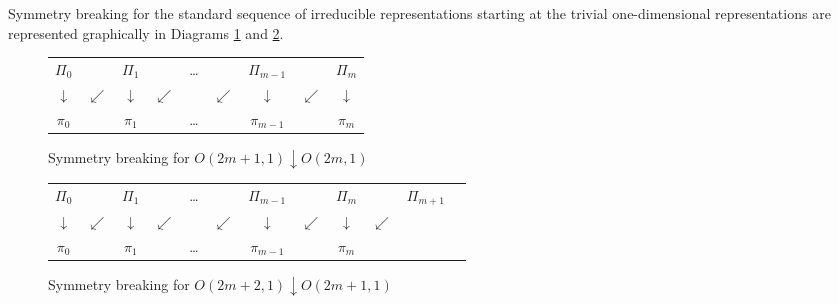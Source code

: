 \begin{theorem} 
\label{thm:SBOfg}
Symmetry breaking for the standard sequence
 of irreducible representations
 starting at the trivial one-dimensional representations
 are represented graphically
 in Diagrams \ref{fig:Hasse1} and \ref{fig:Hasse2}. 

\medskip
\begin{figure}[htp]
\caption{Symmetry breaking for $O(2m+1,1)\downarrow O(2m,1)$}
\begin{center}
\begin{tabular}{c@{~}c@{~}c@{~}c@{~}c@{~}c@{~}c@{~}c@{~}c}
$\Pi_0$ & & $\Pi_1$ & &\dots & & $\Pi_{m-1}$ & & $\Pi_{m}$ 
\\
$\downarrow$ & $\swarrow$ & $\downarrow$ & $\swarrow$ & & $\swarrow$ & $ \downarrow $
&  $\swarrow $  &  $\downarrow$ 
\\
$\pi_0$ & & $\pi_1$ & &\dots & & $\pi_{m-1}$ & & $\pi_{m}$ 
\end{tabular}
\end{center}
\label{fig:Hasse1}
\end{figure}%


\medskip
\begin{figure}[htp]
\caption{Symmetry breaking for $O(2m+2,1) \downarrow O(2m+1,1)$ }
\begin{center}
\begin{tabular}{@{}c@{~}c@{~}c@{~}c@{~}c@{~}c@{~}c@{~}c@{~}c@{~}c@{~}c@{~}c@{}}
$\Pi_0$& &$\Pi_1$& &\dots & & $\Pi_{m-1} $& & $\Pi_{m}$ & &$\Pi_{m+1}$
\\
$\downarrow$ & $\swarrow$ & $\downarrow $ & $\swarrow$ & & $\swarrow$ & $ \downarrow $& $\swarrow $ & $\downarrow$ & $\swarrow$ &
\\
$\pi_0$& &$\pi_1$& &\dots & & $\pi_{m-1}$ & & $\pi_{m}$ &
\end{tabular}
\end{center}
\label{fig:Hasse2}
\end{figure}%
\end{theorem}

\newpage
